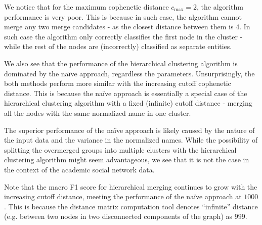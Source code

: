 
We notice that for the maximum cophenetic distance $c_{\text{max}} = 2$, the algorithm performance is very poor.
This is because in such case, the algorithm cannot merge any two merge candidates - as the closest distance between them is $4$.
In such case the algorithm only correctly classifies the first node in the cluster - while the rest of the nodes are (incorrectly) classified as separate entities.

We also see that the performance of the hierarchical clustering algorithm is dominated by the naïve approach, regardless the parameters.
Unsurprisingly, the both methods perform more similar with the increasing cutoff cophenetic distance. 
This is because the naïve approach is essentially a special case of the hierarchical clustering algorithm with a fixed (infinite) cutoff distance
 - merging all the nodes with the same normalized name in one cluster.

 The superior performance of the naïve approach is likely caused by the nature of the input data and the variance in the normalized names.
 While the possibility of splitting the overmerged groups into multiple clusters with the hierarchical clustering algorithm might seem advantageous,
 we see that it is not the case in the context of the academic social network data.

 Note that the macro F1 score for hierarchical merging continues to grow with the increasing cutoff distance, 
 meeting the performance of the naïve approach at $1000$. This is because the distance matrix computation tool 
 denotes “infinite” distance (e.g. between two nodes in two disconnected components of the graph) as $999$.
